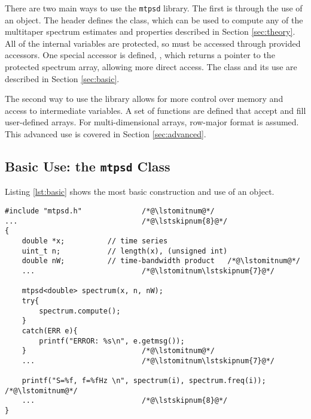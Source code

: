 There are two main ways to use the \texttt{mtpsd} library.  The first is through the use of an object.  The  header defines the  class, which can be used to compute any of the multitaper spectrum estimates and properties described in Section \ref{sec:theory}.  All of the internal variables are protected, so must be accessed through provided accessors.  One special accessor is defined, , which returns a  pointer to the protected spectrum array, allowing more direct access.  The class and its use are described in Section \ref{sec:basic}.

The second way to use the library allows for more control over memory and access to intermediate variables.  A set of functions are defined that accept and fill user-defined arrays.  For multi-dimensional arrays, row-major format is assumed.  This advanced use is covered in Section \ref{sec:advanced}.

\subsection{Basic Use: the \texttt{mtpsd} Class \label{sec:basic}}

Listing \ref{lst:basic} shows the most basic construction and use of an  object.  
\begin{lstlisting}[label=lst:basic,caption=Basic example of the \texttt{mtpsd} class]
#include "mtpsd.h"              /*@\lstomitnum@*/
...                             /*@\lstskipnum{8}@*/
{
    double *x;          // time series
    uint_t n;           // length(x), (unsigned int)
    double nW;          // time-bandwidth product   /*@\lstomitnum@*/
    ...                         /*@\lstomitnum\lstskipnum{7}@*/
    
    mtpsd<double> spectrum(x, n, nW);
    try{
        spectrum.compute();
    }
    catch(ERR e){
        printf("ERROR: %s\n", e.getmsg());   
    }                           /*@\lstomitnum@*/
    ...                         /*@\lstomitnum\lstskipnum{7}@*/
    
    printf("S=%f, f=%fHz \n", spectrum(i), spectrum.freq(i));    /*@\lstomitnum@*/
    ...                         /*@\lstskipnum{8}@*/
}
\end{lstlisting}
\smallskip

